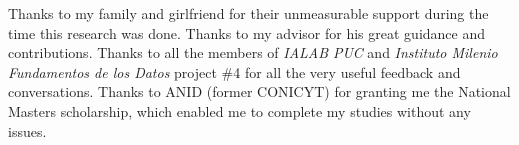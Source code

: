 Thanks to my family and girlfriend for their unmeasurable support during the time
this research was done. Thanks to my advisor for his great guidance and contributions.
Thanks to all the members of \textit{IALAB PUC} and \textit{Instituto Milenio Fundamentos de los Datos}
project \#4 for all the very useful feedback and conversations. Thanks to ANID (former CONICYT) for
granting me the National Masters scholarship, which enabled me to complete my studies without
any issues.



